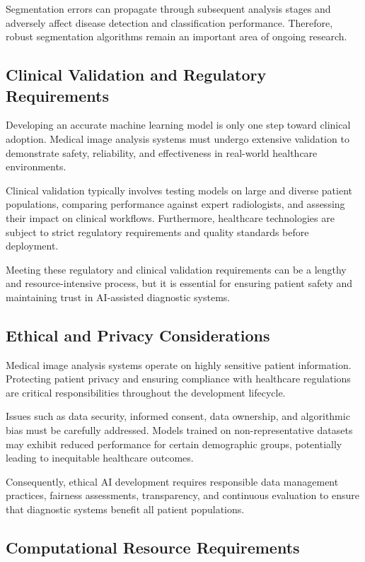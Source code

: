 Segmentation errors can propagate through subsequent analysis stages and adversely affect disease detection and classification performance. Therefore, robust segmentation algorithms remain an important area of ongoing research.

\subsection{Clinical Validation and Regulatory Requirements}

Developing an accurate machine learning model is only one step toward clinical adoption. Medical image analysis systems must undergo extensive validation to demonstrate safety, reliability, and effectiveness in real-world healthcare environments.

Clinical validation typically involves testing models on large and diverse patient populations, comparing performance against expert radiologists, and assessing their impact on clinical workflows. Furthermore, healthcare technologies are subject to strict regulatory requirements and quality standards before deployment.

Meeting these regulatory and clinical validation requirements can be a lengthy and resource-intensive process, but it is essential for ensuring patient safety and maintaining trust in AI-assisted diagnostic systems.

\subsection{Ethical and Privacy Considerations}

Medical image analysis systems operate on highly sensitive patient information. Protecting patient privacy and ensuring compliance with healthcare regulations are critical responsibilities throughout the development lifecycle.

Issues such as data security, informed consent, data ownership, and algorithmic bias must be carefully addressed. Models trained on non-representative datasets may exhibit reduced performance for certain demographic groups, potentially leading to inequitable healthcare outcomes.

Consequently, ethical AI development requires responsible data management practices, fairness assessments, transparency, and continuous evaluation to ensure that diagnostic systems benefit all patient populations.

\subsection{Computational Resource Requirements}

